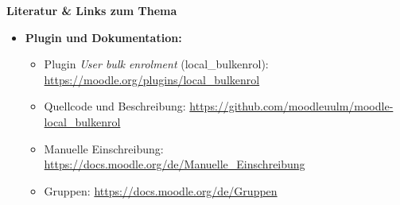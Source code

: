 \documentclass{article}
\newlength{\commonwidth}
\begin{document}
\begin{center}
\begin{minipage}{\commonwidth}
\begin{mdframed}[
    backgroundcolor=lightgray,
    linewidth=0pt,
    roundcorner=5pt,
    innerleftmargin=1em,
    innerrightmargin=1em,
    innertopmargin=0.7em,
    innerbottommargin=0.7em
]
\raggedright
\textbf{\textcolor{customred}{Literatur \& Links zum Thema}}
\vspace{0.2cm}

\begin{itemize}
\item \textbf{Plugin und Dokumentation:}
\vspace{0.2cm}
  \begin{itemize}
  \item Plugin \emph{User bulk enrolment} (local\_bulkenrol): \url{https://moodle.org/plugins/local_bulkenrol}
  \item Quellcode und Beschreibung: \url{https://github.com/moodleuulm/moodle-local_bulkenrol}
  \item Manuelle Einschreibung: \url{https://docs.moodle.org/de/Manuelle_Einschreibung}
  \item Gruppen: \url{https://docs.moodle.org/de/Gruppen}
  \end{itemize}
\vspace{0.5cm}
\end{itemize}
\end{mdframed}
\end{minipage}
\end{center}
\end{document}

